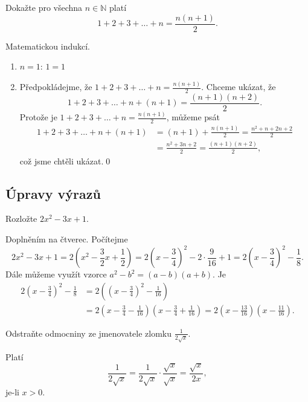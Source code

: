 \begin{priklad}
Dokažte pro všechna $n\in \mathbb N$ platí
$$1+2+3+\dots+n=\frac{n(n+1)}{2}.$$
\end{priklad}

\begin{reseni}
Matematickou indukcí.
\begin{enumerate}[1.]
\item $n=1$: $1=1$
\item Předpokládejme, že $1+2+3+\dots+n=\frac{n(n+1)}{2}$. Chceme ukázat, že
$$
1+2+3+\dots+n+ (n+1)=\frac{(n+1)(n+2)}{2}.
$$
Protože je $1+2+3+\dots+n=\frac{n(n+1)}{2}$, můžeme psát
\begin{align*}
	1+2+3+\dots+n+ (n+1) &= (n+1) + \frac{n(n+1)}{2} = \frac{n^2+ n + 2n + 2}{2}\\
& = \frac{n^2 + 3n + 2}{2} = \frac{(n+1)(n+2)}{2},
\end{align*}
což jsme chtěli ukázat.\qed
\end{enumerate}
\end{reseni}

\subsection*{Úpravy výrazů}
\begin{priklad}
    Rozložte $2x^2 - 3x+1.$
\end{priklad}

\begin{reseni}
Doplněním na čtverec. Počítejme
$$
    2x^2 - 3x+1 = 2 \left( x^2 -\frac{3}{2}x + \frac{1}{2} \right ) = 2 \left( x-\frac{3}{4} \right )^2 - 2 \cdot \frac{9}{16} + 1 = 2 \left( x-\frac{3}{4} \right )^2 - \frac{1}{8}.
$$
Dále můžeme využít vzorce $a^2-b^2 = (a-b)(a+b)$. Je
\begin{align*}
	2 \left( x-\frac{3}{4} \right )^2 - \frac{1}{8} &= 2 \left( \left( x-\frac{3}{4} \right )^2 - \frac{1}{16}  \right ) \\
	&=2 \left( x-\frac{3}{4} - \frac{1}{16}\right )  \left( x-\frac{3}{4} + \frac{1}{16}\right ) = 2  \left( x-\frac{13}{16}\right )  \left( x-\frac{11}{16}\right ).
\end{align*}
\end{reseni}

\begin{priklad}
Odstraňte odmocniny ze jmenovatele zlomku $\frac{1}{2 \sqrt{x} }.$
\end{priklad}

\begin{reseni}
Platí
$$\frac{1}{2\sqrt{x} }=\frac{1}{2\sqrt{x} }\cdot \frac{\sqrt{x} }{\sqrt{x} }=\frac{\sqrt{x} }{2x},$$
je-li $x>0.$
\end{reseni}

